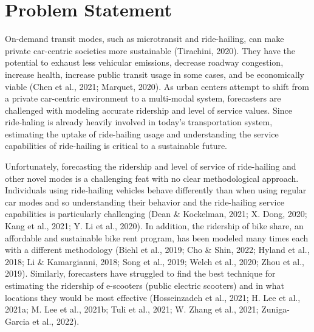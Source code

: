 \documentclass[simple, masters, twoside]{byuthesis}
\begin{document}
\hypertarget{problem-statement}{%
\section{Problem Statement}\label{problem-statement}}

On-demand transit modes, such as microtransit and ride-hailing, can make private car-centric societies more sustainable (Tirachini, 2020). They have the potential to exhaust less vehicular emissions, decrease roadway congestion, increase health, increase public transit usage in some cases, and be economically viable (Chen et al., 2021; Marquet, 2020). As urban centers attempt to shift from a private car-centric environment to a multi-modal system, forecasters are challenged with modeling accurate ridership and level of service values. Since ride-haling is already heavily involved in today's transportation system, estimating the uptake of ride-hailing usage and understanding the service capabilities of ride-hailing is critical to a sustainable future.

Unfortunately, forecasting the ridership and level of service of ride-hailing and other novel modes is a challenging feat with no clear methodological approach. Individuals using ride-hailing vehicles behave differently than when using regular car modes and so understanding their behavior and the ride-hailing service capabilities is particularly challenging (Dean \& Kockelman, 2021; X. Dong, 2020; Kang et al., 2021; Y. Li et al., 2020). In addition, the ridership of bike share, an affordable and sustainable bike rent program, has been modeled many times each with a different methodology (Biehl et al., 2019; Cho \& Shin, 2022; Hyland et al., 2018; Li \& Kamargianni, 2018; Song et al., 2019; Welch et al., 2020; Zhou et al., 2019). Similarly, forecasters have struggled to find the best technique for estimating the ridership of e-scooters (public electric scooters) and in what locations they would be most effective (Hosseinzadeh et al., 2021; H. Lee et al., 2021a; M. Lee et al., 2021b; Tuli et al., 2021; W. Zhang et al., 2021; Zuniga-Garcia et al., 2022).
\end{document}
